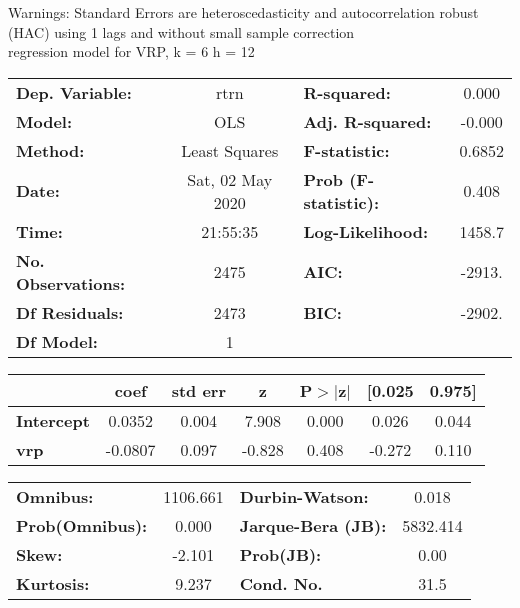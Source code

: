 Warnings: \newline
 [1] Standard Errors are heteroscedasticity and autocorrelation robust (HAC) using 1 lags and without small sample correction\\ 

regression model for VRP, k = 6 h = 12\begin{center}
\begin{tabular}{lclc}
\toprule
\textbf{Dep. Variable:}    &       rtrn       & \textbf{  R-squared:         } &     0.000   \\
\textbf{Model:}            &       OLS        & \textbf{  Adj. R-squared:    } &    -0.000   \\
\textbf{Method:}           &  Least Squares   & \textbf{  F-statistic:       } &    0.6852   \\
\textbf{Date:}             & Sat, 02 May 2020 & \textbf{  Prob (F-statistic):} &    0.408    \\
\textbf{Time:}             &     21:55:35     & \textbf{  Log-Likelihood:    } &    1458.7   \\
\textbf{No. Observations:} &        2475      & \textbf{  AIC:               } &    -2913.   \\
\textbf{Df Residuals:}     &        2473      & \textbf{  BIC:               } &    -2902.   \\
\textbf{Df Model:}         &           1      & \textbf{                     } &             \\
\bottomrule
\end{tabular}
\begin{tabular}{lcccccc}
                   & \textbf{coef} & \textbf{std err} & \textbf{z} & \textbf{P$> |$z$|$} & \textbf{[0.025} & \textbf{0.975]}  \\
\midrule
\textbf{Intercept} &       0.0352  &        0.004     &     7.908  &         0.000        &        0.026    &        0.044     \\
\textbf{vrp}       &      -0.0807  &        0.097     &    -0.828  &         0.408        &       -0.272    &        0.110     \\
\bottomrule
\end{tabular}
\begin{tabular}{lclc}
\textbf{Omnibus:}       & 1106.661 & \textbf{  Durbin-Watson:     } &    0.018  \\
\textbf{Prob(Omnibus):} &   0.000  & \textbf{  Jarque-Bera (JB):  } & 5832.414  \\
\textbf{Skew:}          &  -2.101  & \textbf{  Prob(JB):          } &     0.00  \\
\textbf{Kurtosis:}      &   9.237  & \textbf{  Cond. No.          } &     31.5  \\
\bottomrule
\end{tabular}
\end{center}

